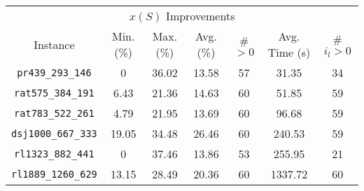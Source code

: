 \begin{tabular}{|c|cccc|c|c|}
    \toprule
    {} & \multicolumn{4}{|c|}{$x(S)$ Improvements} & {} & {} \\
    Instance &          Min. (\%) & Max. (\%) & Avg. (\%) &      \# $> 0$ &  Avg. Time (s) &  \# $i_l > 0$ \\
    \midrule
    \texttt{pr439\_293\_146}   &      0    &     36.02 &     13.58 &          57 &     31.35 &        34 \\
    \texttt{rat575\_384\_191}  &      6.43 &     21.36 &     14.63 &          60 &     51.85 &        59 \\
    \texttt{rat783\_522\_261}  &      4.79 &     21.95 &     13.69 &          60 &     96.68 &        59 \\
    \texttt{dsj1000\_667\_333} &     19.05 &     34.48 &     26.46 &          60 &    240.53 &        59 \\
    \texttt{rl1323\_882\_441}  &      0    &     37.46 &     13.86 &          53 &    255.95 &        21 \\
    \texttt{rl1889\_1260\_629} &     13.15 &     28.49 &     20.36 &          60 &   1337.72 &        60 \\
    \bottomrule
\end{tabular}
